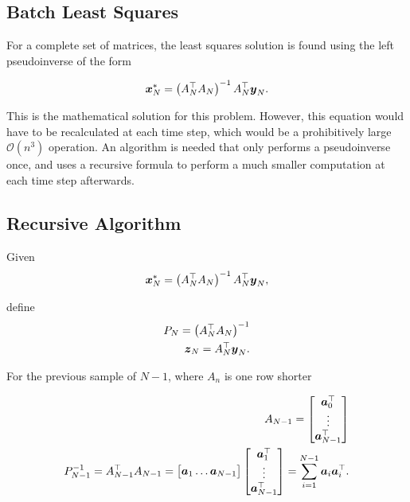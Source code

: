 \subsection{Batch Least Squares}

For a complete set of matrices, the least squares solution is found using the left pseudoinverse of the form

\begin{align*}
    \boldsymbol{x}^*_N = \left(A_N^\top A_N\right)^{-1} A_N^\top \boldsymbol{y}_N.
\end{align*}

This is the mathematical solution for this problem. 
However, this equation would have to be recalculated at each time step, which would be a prohibitively large $\mathcal{O}(n^3)$ operation. 
An algorithm is needed that only performs a pseudoinverse once, and uses a recursive formula to perform a much smaller computation at each time step afterwards.

\subsection{Recursive Algorithm}

Given
\begin{align*}
    \boldsymbol{x}^*_N = \left(A_N^\top A_N\right)^{-1} A_N^\top \boldsymbol{y}_N,
\end{align*}

define
\begin{align*}
    P_N = \left(A_N^\top A_N\right)^{-1}\\
    \boldsymbol{z}_N = A_N^\top \boldsymbol{y}_N.
\end{align*}

For the previous sample of $N-1$, where $A_n$ is one row shorter

\begin{align}
    A_{N-1} = 
    \begin{bmatrix}
        \boldsymbol{a}_0^\top\\
        \vdots\\
        \boldsymbol{a}_{N-1}^\top
    \end{bmatrix}\\
    P_{N-1}^{-1} = A_{N-1}^\top A_{N-1} =
    \begin{bmatrix}
        \boldsymbol{a}_1 \hdots \boldsymbol{a}_{N-1}
    \end{bmatrix}
    \begin{bmatrix}
        \boldsymbol{a}_1^\top\\
        \vdots\\
        \boldsymbol{a}_{N-1}^\top
    \end{bmatrix}
    =\sum_{i=1}^{N-1} \boldsymbol{a}_i \boldsymbol{a}_i^\top.
\end{align}

